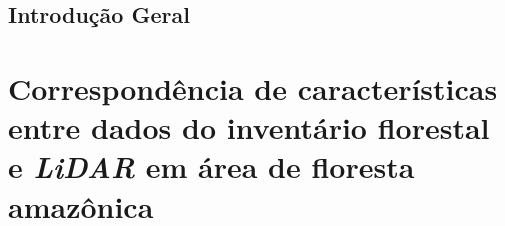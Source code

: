 \documentclass[
	12pt,				%
	openright,			%
	twoside,			%
	a4paper,			%
	chapter=TITLE,		%
	sumario=abnt-6027-2012,
	english,			%
	brazil				%
	]{UFVJM-abntex2}
\newcommand{\li}{\textit{LiDAR }}
\begin{document}


\tableofcontents
\cleardoublepage



\textual

\chapter*[Introdução Geral]{Introdução Geral}


%



\renewcommand{\partname}{Artigo}

\part{Correspondência de características entre dados do inventário florestal e \li em área de floresta amazônica}
%
%
\end{document}
